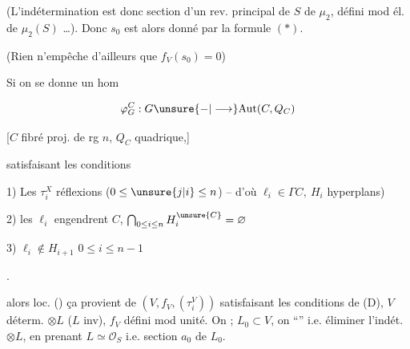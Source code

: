 
(L'indétermination est donc section d'un rev. principal de $S$ de  $\mu_2$, défini mod él. de $\mu_2(S)$ \ldots). Donc $s_0$ est alors donné par la formule $(*)$.

(Rien n'empêche d'ailleurs que $f_V(s_0)=0$)


Si on se donne un hom

\[
\varphi_G^C:G\unsure{-|\longrightarrow}\mathrm{Aut}(C,Q_C)
\]

[$C$ fibré proj. de rg $n$, $Q_C$ quadrique,]

satisfaisant les conditions

1) Les $\tau_i^X$ réflexions  \qquad ($0\le\unsure{j|i}\le n$) -- d'où $\ell_i\in\Gamma C,\ H_i$ hyperplans)

2) les $\ell_i$ engendrent $C$,  $\bigcap_{0\le i\le n}H_i^{\unsure{C}}=\varnothing$

3)  $\ell_i\notin H_{i+1}$ \qquad $0\le i\le n-1$

.

\margin{Pour $n\ge2$ (si $n=1$, une réflexion de la droite \unsure{pr.} $C=\mathrm P(V)$ ne se remonte pas de \uline{façon univoque} en une réfl. de $V$ \ldots]}

alors loc. () ça provient de $(V,f_V,(\tau_i^V))$ satisfaisant les conditions de (D), $V$ déterm.  $\otimes L$ ($L$ inv), $f_V$ défini mod unité. On   ; $L_0\subset V$, on  ``'' i.e. éliminer l'indét. $\otimes L$, en prenant $L\simeq\mathcal O_S$ i.e. section $a_0$ de $L_0$.
